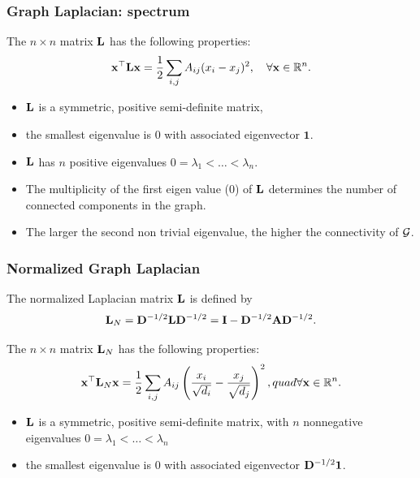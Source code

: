 \documentclass{beamer}\usepackage[]{graphicx}\usepackage[]{color}
\begin{document}
\begin{frame}
  \frametitle{Graph Laplacian: spectrum}

  \begin{proposition}[Spectrum of $\bL$]
    The $n\times n$ matrix $\bL$ has the following properties:
    \[
      \mathbf{x}^\top \mathbf{L} \mathbf{x} = \frac{1}{2} \sum_{i,j} A_{ij} (x_i - x_j)^2, \quad \forall \mathbf{x}\in\mathbb{R}^n .
    \]
    \vspace{-.25cm}
    \begin{itemize}
      \item $\bL$ is a symmetric, positive semi-definite matrix,
      \item  the smallest eigenvalue is $0$ with associated eigenvector $\mathbf{1}$.
      \item $\bL$ has $n$ positive eigenvalues $0=\lambda_1<\dots <\lambda_n$. 
    \end{itemize}  
  \end{proposition}

  \begin{corollary}
    \vspace{-.25cm}
    \begin{itemize}
      \item The multiplicity of the first eigen value ($0$) of $\bL$ determines the number of connected components in the graph.
      \item The larger the second non trivial eigenvalue, the higher the connectivity of $\mathcal{G}$.
    \end{itemize}  
  \end{corollary}

\end{frame}

\begin{frame}
  \frametitle{Normalized Graph Laplacian}

  \begin{definition}
    The normalized Laplacian matrix $\bL$ is defined by 
    \[
      \mathbf{L}_N = \mathbf{D}^{-1/2}\mathbf{L}\mathbf{D}^{-1/2} = \mathbf{I} - \mathbf{D}^{-1/2} \mathbf{A} \mathbf{D}^{-1/2}.
    \]
  \end{definition}

  \begin{proposition}
    The $n\times n$ matrix $\mathbf{L}_N$ has the following properties:
      \[
        \mathbf{x}^\top \mathbf{L}_N \mathbf{x} = \frac{1}{2} \sum_{i,j} A_{ij}\left(\frac{x_i}{\sqrt{d_i}} - \frac{x_j}{\sqrt{d_j}} \right)^2, quad\forall\mathbf{x}\in\mathbb{R}^n.
      \]
    \vspace{-.25cm}
    \begin{itemize}
      \item $\bL$ is a symmetric, positive semi-definite matrix, with $n$ nonnegative eigenvalues $0=\lambda_1<\dots <\lambda_n$
      \item  the smallest eigenvalue is $0$ with associated eigenvector $\mathbf{D}^{-1/2}\mathbf{1}$.
    \end{itemize}  
  \end{proposition}

\end{frame}
\end{document}

